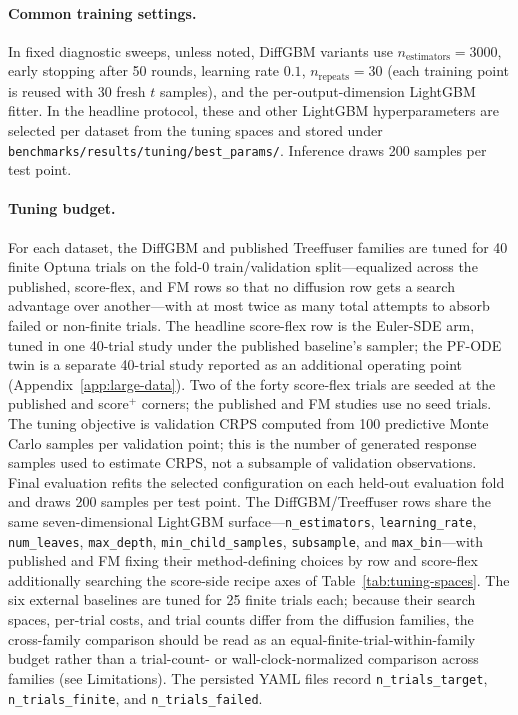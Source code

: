 \documentclass{article}
\begin{document}
\paragraph{Common training settings.} In fixed diagnostic sweeps, unless noted, DiffGBM variants use $n_{\text{estimators}}=3000$, early stopping after 50 rounds, learning rate $0.1$, $n_{\text{repeats}}=30$ (each training point is reused with 30 fresh $t$ samples), and the per-output-dimension LightGBM fitter. In the headline protocol, these and other LightGBM hyperparameters are selected per dataset from the tuning spaces and stored under \texttt{benchmarks/results/tuning/best\_params/}. Inference draws 200 samples per test point.

\paragraph{Tuning budget.} For each dataset, the DiffGBM and published Treeffuser families are tuned for 40 finite Optuna trials on the fold-0 train/validation split---equalized across the published, score-flex, and FM rows so that no diffusion row gets a search advantage over another---with at most twice as many total attempts to absorb failed or non-finite trials. The headline score-flex row is the Euler-SDE arm, tuned in one 40-trial study under the published baseline's sampler; the PF-ODE twin is a separate 40-trial study reported as an additional operating point (Appendix~\ref{app:large-data}). Two of the forty score-flex trials are seeded at the published and score$^+$ corners; the published and FM studies use no seed trials. The tuning objective is validation CRPS computed from 100 predictive Monte Carlo samples per validation point; this is the number of generated response samples used to estimate CRPS, not a subsample of validation observations. Final evaluation refits the selected configuration on each held-out evaluation fold and draws 200 samples per test point. The DiffGBM/Treeffuser rows share the same seven-dimensional LightGBM surface---\texttt{n\_estimators}, \texttt{learning\_rate}, \texttt{num\_leaves}, \texttt{max\_depth}, \texttt{min\_child\_samples}, \texttt{subsample}, and \texttt{max\_bin}---with published and FM fixing their method-defining choices by row and score-flex additionally searching the score-side recipe axes of Table~\ref{tab:tuning-spaces}. The six external baselines are tuned for 25 finite trials each; because their search spaces, per-trial costs, and trial counts differ from the diffusion families, the cross-family comparison should be read as an equal-finite-trial-within-family budget rather than a trial-count- or wall-clock-normalized comparison across families (see Limitations). The persisted YAML files record \texttt{n\_trials\_target}, \texttt{n\_trials\_finite}, and \texttt{n\_trials\_failed}.
\end{document}
